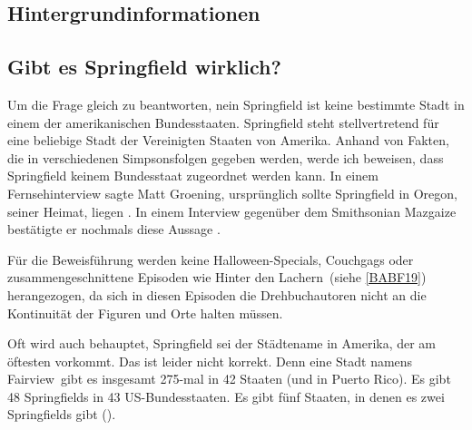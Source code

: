 \begin{appendix}

\chapter{Hintergrundinformationen}

\section{Gibt es Springfield wirklich?}\label{ExistiertSpringfield}
Um die Frage gleich zu beantworten, nein Springfield ist keine bestimmte Stadt in einem der amerikanischen Bundesstaaten. Springfield steht stellvertretend für eine beliebige Stadt der Vereinigten Staaten von Amerika. Anhand von Fakten, die in verschiedenen Simpsonsfolgen gegeben werden, werde ich beweisen, dass Springfield keinem Bundesstaat zugeordnet werden kann. In einem Fernsehinterview sagte Matt Groening, ursprünglich sollte Springfield in Oregon, seiner Heimat, liegen \cite{InterviewGroening}. In einem Interview gegenüber dem Smithsonian Mazgaize bestätigte er nochmals diese Aussage \cite{Smithsonian}.

Für die Beweisführung werden keine Halloween-Specials, Couchgags oder zusammengeschnittene Episoden wie \glqq Hinter den Lachern\grqq\ (siehe \ref{BABF19}) herangezogen, da sich in diesen Episoden die Drehbuchautoren nicht an die Kontinuität der Figuren und Orte halten müssen.

Oft wird auch behauptet, Springfield sei der Städtename in Amerika, der am öftesten vorkommt. Das ist leider nicht korrekt. Denn eine Stadt namens \glqq Fairview\grqq\ gibt es insgesamt 275-mal in 42 Staaten (und in Puerto Rico). Es gibt 48 Springfields in 43 US-Bundesstaaten. Es gibt fünf Staaten, in denen es zwei Springfields gibt (\cite{Reiss19}).


\end{appendix}
